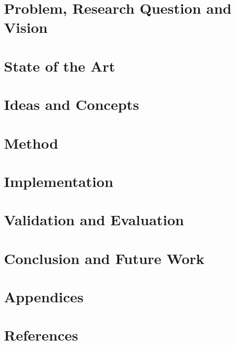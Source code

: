 \documentclass[%
  paper=a4,
  fontsize=11pt,
  BCOR=8mm,
  DIV=12,
  headings=normal,1
  parskip=half,
  numbers=noendperiod
]{scrreprt}
\begin{document}
\newpage

\tableofcontents

\clearpage
{}
\setcounter{page}{1}

\chapter{Problem, Research Question and Vision}


\chapter{State of the Art}


\chapter{Ideas and Concepts}


\chapter{Method}


\chapter{Implementation}


\chapter{Validation and Evaluation}


\chapter{Conclusion and Future Work}


\chapter{Appendices}


\chapter{References}

\end{document}
